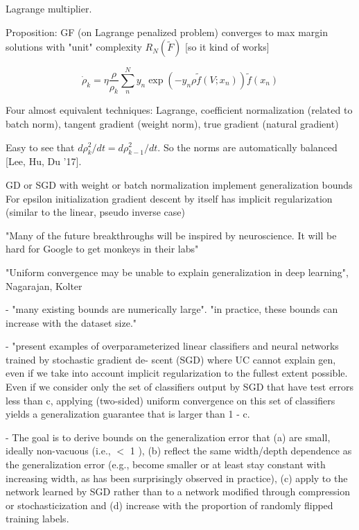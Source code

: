 \documentclass[english]{article}
\begin{document}
\item Lagrange multiplier. 

Proposition: GF (on Lagrange penalized problem) converges to max margin solutions with "unit" complexity $R_N(\tilde F)$ [so it kind of works]

$$
\dot \rho_k 
= 
\eta
\frac{\rho}{\rho_k}
\sum_n^N y_n\exp(-y_n\rho \tilde f(V;x_n))
\tilde f(x_n)
$$

Four almost equivalent techniques: Lagrange, coefficient normalization (related to batch norm), tangent gradient (weight norm), true gradient (natural gradient)

Easy to see that $d\rho_k^2/dt = d\rho_{k-1}^2/dt$. So the norms are automatically balanced [Lee, Hu, Du '17]. 

GD or SGD with weight or batch normalization implement generalization bounds For epsilon initialization gradient descent by itself has implicit regularization (similar to the linear, pseudo inverse case)

"Many of the future breakthroughs will be inspired by neuroscience. It will be hard for Google to get monkeys in their labs"

\eenum

\item "Uniform convergence may be unable to explain generalization in deep learning", Nagarajan, Kolter

- "many existing bounds are numerically large". "in practice, these bounds can increase with the dataset size."

- "present examples of overparameterized linear classifiers and
neural networks trained by stochastic gradient de-
scent (SGD) where UC cannot explain gen, even if we take
into account implicit regularization to the fullest
extent possible. Even if we consider only the set of classifiers output by SGD that
have test errors less than c, applying
(two-sided) uniform convergence on this set of
classifiers yields a generalization guarantee that is
larger than 1 - c.

-  The goal is to derive
bounds on the generalization error that (a) are small, ideally
non-vacuous (i.e., $<$ 1 ), (b) reflect the same width/depth
dependence as the generalization error (e.g., become smaller
or at least stay constant with increasing width, as has been
surprisingly observed in practice), (c) apply to the network
learned by SGD rather than to a network modified through
compression or stochasticization and (d) increase with the
proportion of randomly flipped training labels.
\end{document}
